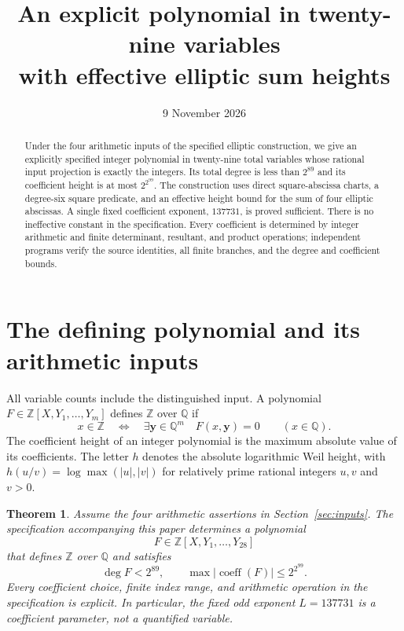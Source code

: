 \documentclass[11pt,a4paper]{article}
\title{An explicit polynomial in twenty-nine variables\\
with effective elliptic sum heights}
\author{}\date{9 November 2026}
\newtheorem{theorem}{Theorem}\newtheorem{lemma}[theorem]{Lemma}
\newcommand{\Q}{\mathbb Q}\newcommand{\Z}{\mathbb Z}
\begin{document}
\maketitle
\begin{abstract}
Under the four arithmetic inputs of the specified elliptic construction,
we give an explicitly specified integer polynomial in twenty-nine total
variables whose rational input projection is exactly the integers.
Its total degree is less than $2^{89}$ and its coefficient height is
at most $2^{2^{99}}$. The construction uses direct square-abscissa
charts, a degree-six square predicate, and an effective height bound
for the sum of four elliptic abscissas. A single fixed coefficient
exponent, $137731$, is proved sufficient. There is no ineffective
constant in the specification. Every coefficient is determined by
integer arithmetic and finite determinant, resultant, and
product operations; independent programs verify the source identities,
all finite branches, and the degree and coefficient bounds.
\end{abstract}

\section{The defining polynomial and its arithmetic inputs}

All variable counts include the distinguished input. A polynomial
$F\in\Z[X,Y_1,\ldots,Y_m]$ defines $\Z$ over $\Q$ if
\[
 x\in\Z\quad\Longleftrightarrow\quad
 \exists\mathbf y\in\Q^m\quad F(x,\mathbf y)=0
 \qquad(x\in\Q).
\]
The coefficient height of an integer polynomial is the maximum
absolute value of its coefficients. The letter $h$ denotes the
absolute logarithmic Weil height, with $h(u/v)=\log\max(|u|,|v|)$
for relatively prime rational integers $u,v$ and $v>0$.

\begin{theorem}\label{thm:main}
Assume the four arithmetic assertions in Section~\ref{sec:inputs}.
The specification accompanying this paper determines a polynomial
\[
                   F\in\Z[X,Y_1,\ldots,Y_{28}]
\]
that defines $\Z$ over $\Q$ and satisfies
\[
             \deg F<2^{89},\qquad
             \max|\operatorname{coeff}(F)|\le2^{2^{99}}.
\]
Every coefficient choice, finite index range, and arithmetic operation
in the specification is explicit. In particular, the fixed odd exponent
$L=137731$ is a coefficient parameter, not a quantified variable.
\end{theorem}
\end{document}
